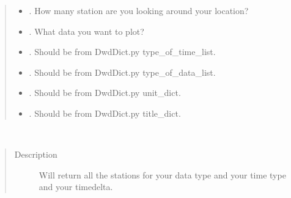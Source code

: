 \documentclass[letterpaper,10pt,english]{sphinxmanual}
\begin{document}
\begin{fulllineitems}
\begin{fulllineitems}
\begin{quote}
\begin{description}
\begin{itemize}
\item {} 
\sphinxAtStartPar
{} \textendash{} . How many station are you looking around your location?

\item {} 
\sphinxAtStartPar
{} \textendash{} . What data you want to plot?

\item {} 
\sphinxAtStartPar
{} \textendash{} . Should be from DwdDict.py type\_of\_time\_list.

\item {} 
\sphinxAtStartPar
{} \textendash{} . Should be from DwdDict.py type\_of\_data\_list.

\item {} 
\sphinxAtStartPar
{} \textendash{} . Should be from DwdDict.py unit\_dict.

\item {} 
\sphinxAtStartPar
{} \textendash{} . Should be from DwdDict.py title\_dict.

\end{itemize}

\end{description}\end{quote}

\end{fulllineitems}


\begin{fulllineitems}
\label{\detokenize{DwdMain:DwdMain.DwdMain.main_activ_stations_in_date}}~\begin{quote}\begin{description}
\item[{Description}] \leavevmode
\sphinxAtStartPar
Will return all the stations for your data type and your time type and your timedelta.


\end{description}
\end{quote}
\end{fulllineitems}
\end{fulllineitems}
\end{document}
